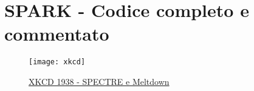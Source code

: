 \chapter{SPARK - Codice completo e commentato}

	
	
	\cleardoublepage
	\thispagestyle{empty}
	\begin{figure}
		\begin{center}
			\texttt{[image: xkcd]}
			\caption[XKCD 1938 - SPECTRE e Meltdown]{\href{https://xkcd.com/1938/}{XKCD 1938 - SPECTRE e Meltdown}}
		\end{center}
	\end{figure}